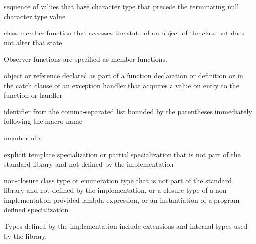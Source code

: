 %
%
sequence of values that have
character type
that precede the terminating null character type
value

%
class member function that accesses the state of an object of the class
but does not alter that state

\begin{defnote}
Observer functions are specified as
member functions.
\end{defnote}

%
%
%
 object or reference declared as part of a function declaration or
definition or in the catch clause of an exception handler that
acquires a value on entry to the function or handler

%
%
 identifier from
the comma-separated list bounded by the parentheses immediately
following the macro name

%
%
 member of a 

%
explicit template specialization or partial specialization
that is not part of the \Cpp{} standard library and
not defined by the implementation

%
non-closure class type or enumeration type
that is not part of the \Cpp{} standard library and
not defined by the implementation,
or a closure type of a non-implementation-provided lambda expression,
or an instantiation of a program-defined specialization

\begin{defnote}
Types defined by the implementation include
extensions and internal types used by the library.
\end{defnote}

